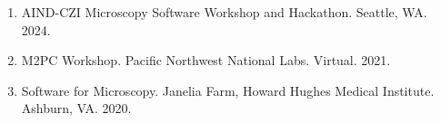 \begin{enumerate}  
\item AIND-CZI Microscopy Software Workshop and Hackathon. Seattle, WA. 2024.
\item M2PC Workshop.  Pacific Northwest National Labs. Virtual. 2021.
\item Software for Microscopy.  Janelia Farm, Howard Hughes Medical Institute.  Ashburn, VA. 2020. 
\end{enumerate}